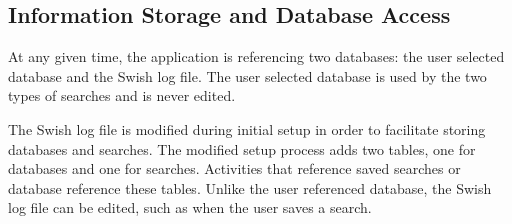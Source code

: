 \documentclass[letterpaper,11pt,twoside,final]{article}
\begin{document}
\subsection*{Information Storage and Database Access}
At any given time, the application is referencing two databases: the
user selected database and the Swish log file. The user selected
database is used by the two types of searches and is never edited.

The Swish log file is modified during initial setup in order to facilitate storing
databases and searches. The modified setup process adds two tables,
one for databases and one for searches. Activities that reference saved searches or
database reference these tables. Unlike the user referenced database,
the Swish log file can be edited, such as when the user saves a
search.
\end{document}
